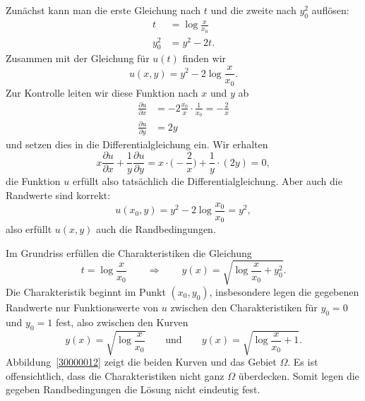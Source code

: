 \begin{loesung}
\begin{teilaufgaben}
Zunächst kann man die erste Gleichung nach $t$ und die zweite nach $y_0^2$
auflösen: 
\begin{align*}
t&=\log\frac{x}{x_0}\\
y_0^2&=y^2-2t.
\end{align*}
Zusammen mit der Gleichung für $u(t)$ finden wir
\[
u(x,y) = y^2 - 2\log\frac{x}{x_0}.
\]
Zur Kontrolle leiten wir diese Funktion nach $x$ und $y$ ab
\begin{align*}
\frac{\partial u}{\partial x}
&=
-2\frac{x_0}{x}\cdot\frac1{x_0}=-\frac2x
\\
\frac{\partial u}{\partial y}
&=
2y
\end{align*}
und setzen dies in die Differentialgleichung ein.
Wir erhalten
\[
x\frac{\partial u}{\partial x} + \frac1y\frac{\partial u}{\partial y}
=
x\cdot \biggl(-\frac{2}{x}\biggr)
+ \frac1y\cdot (2y)
=
0,
\]
die Funktion $u$ erfüllt also tatsächlich die Differentialgleichung.
Aber auch die Randwerte sind korrekt:
\[
u(x_0,y)=y^2-2\log\frac{x_0}{x_0}=y^2,
\]
also erfüllt $u(x,y)$ auch die Randbedingungen.
\item
Im Grundriss erfüllen die Charakteristiken die Gleichung
\[
t = \log\frac{x}{x_0}
\qquad\Rightarrow\qquad
y(x)=\sqrt{\log\frac{x}{x_0}+y_0^2}.
\]
Die Charakteristik beginnt im Punkt $(x_0,y_0)$, insbesondere legen die
gegebenen Randwerte nur Funktionswerte von $u$ zwischen den Charakteristiken
für $y_0=0$ und $y_0=1$ fest, also zwischen den Kurven
\[
y(x) = \sqrt{\log\frac{x}{x_0}}
\qquad\text{und}\qquad
y(x) = \sqrt{\log\frac{x}{x_0}+1}.
\]
Abbildung~\ref{30000012} zeigt die beiden Kurven und das Gebiet $\Omega$.
Es ist offensichtlich, dass die Charakteristiken nicht ganz $\Omega$
überdecken.
Somit legen die gegeben Randbedingungen die Lösung nicht eindeutig fest.
\qedhere
\end{teilaufgaben}
\end{loesung}

